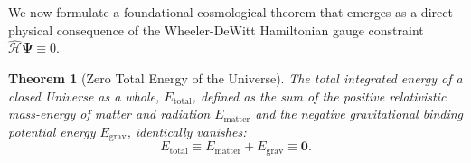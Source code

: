 \documentclass[11pt,a4paper]{article}
\newtheorem{theorem}{Theorem}[section]
\theoremstyle{definition}
\begin{document}
We now formulate a foundational cosmological theorem that emerges as a direct physical consequence of the Wheeler-DeWitt Hamiltonian gauge constraint $\hat{\mathcal{H}} \mathbf{\Psi} \equiv 0$.

\begin{theorem}[Zero Total Energy of the Universe]\label{thm:zero_energy}
The total integrated energy of a closed Universe as a whole, $E_{\text{total}}$, defined as the sum of the positive relativistic mass-energy of matter and radiation $E_{\text{matter}}$ and the negative gravitational binding potential energy $E_{\text{grav}}$, identically vanishes:
\begin{equation}\label{eq:3.7}\tag{3.7}
E_{\text{total}} \equiv E_{\text{matter}} + E_{\text{grav}} \equiv \mathbf{0}.
\end{equation}
\end{theorem}
\end{document}
